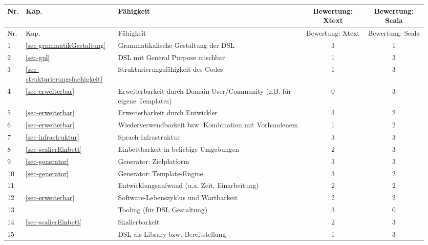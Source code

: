 \begin{longtable}{|p{0.5cm}|p{0.8cm}|p{5cm}|c|c|}

  \hline
  Nr. & Kap. & Fähigkeit & Bewertung: Xtext & Bewertung: Scala \\ \hline \hline
  \endfirsthead

  \hline
  Nr. & Kap. & Fähigkeit & Bewertung: Xtext & Bewertung: Scala \\ \hline
  \endhead

  1
  & \ref{sec-grammatikGestaltung}
  & Grammatikalische Gestaltung der DSL
  & 3
  & 1
  \\\hline

  2
  & \ref{sec-gpl}
  & DSL mit General Purpose mischbar
  & 1
  & 3
  \\\hline

  3
  & \ref{sec-strukturierungsfaehigkeit}
  & Strukturierungsfähigkeit des Codes
  & 1
  & 3
  \\\hline

  4
  & \ref{sec-erweiterbar}
  & Erweiterbarkeit durch Domain User/Community (z.B. für eigene Templates)
  & 0
  & 3
  \\\hline

  5
  & \ref{sec-erweiterbar}
  & Erweiterbarkeit durch Entwickler
  & 3
  & 2
  \\\hline

  6
  & \ref{sec-erweiterbar}
  & Wiederverwendbarkeit bzw. Kombination mit Vorhandenem
  & 1
  & 2
  \\\hline

  7
  & \ref{sec-infrastruktur}
  & Sprach-Infrastruktur
  & 3
  & 3
  \\\hline

  8
  & \ref{sec-scalierEinbett}
  & Einbettbarkeit in beliebige Umgebungen
  & 2
  & 3
  \\\hline

  9
  & \ref{sec-generator}
  & Generator: Zielplatform
  & 3
  & 3
  \\\hline

  10
  & \ref{sec-generator}
  & Generator: Template-Engine
  & 3
  & 2
  \\\hline

  11
  &
  & Entwicklungsaufwand (u.a. Zeit, Einarbeitung)
  & 2
  & 2
  \\\hline

  12
  & \ref{sec-erweiterbar}
  & Software-Lebenszyklus und Wartbarkeit
  & 2
  & 2
  \\\hline

  13
  &
  & Tooling (für DSL Gestaltung)
  & 3
  & 0
  \\\hline

  14
  & \ref{sec-scalierEinbett}
  & Skalierbarkeit
  & 2
  & 3
  \\\hline

  15
  &
  & DSL als Library bzw. Bereitstellung
  & 1
  & 3
  \\\hline

\end{longtable}


